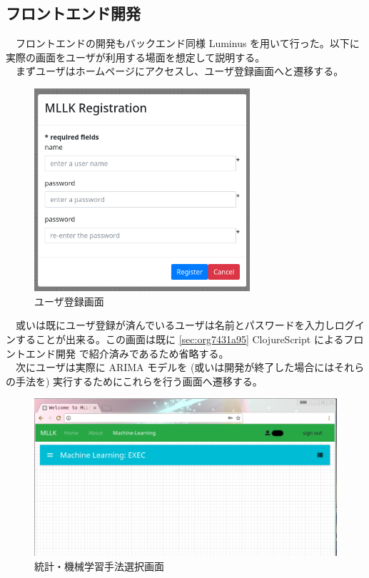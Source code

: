 \documentclass{scrartcl}
\begin{document}
\subsection{フロントエンド開発}
\label{sec:orgcc0a17e}
　フロントエンドの開発もバックエンド同様 Luminus を用いて行った。以下に実際の画面をユーザが利用する場面を想定して説明する。\\
　まずユーザはホームページにアクセスし、ユーザ登録画面へと遷移する。\\
\begin{figure}[htbp]
\centering
\includegraphics[width=8cm]{./register.PNG}
\caption{ユーザ登録画面}
\end{figure}

　或いは既にユーザ登録が済んでいるユーザは名前とパスワードを入力しログインすることが出来る。この画面は既に \ref{sec:org7431a95} ClojureScript によるフロントエンド開発 で紹介済みであるため省略する。\\
\newpage
　次にユーザは実際に ARIMA モデルを (或いは開発が終了した場合にはそれらの手法を) 実行するためにこれらを行う画面へ遷移する。\\
\begin{figure}[htbp]
\centering
\includegraphics[width=12cm]{./ml-view.PNG}
\caption{統計・機械学習手法選択画面}
\end{figure}
\end{document}
